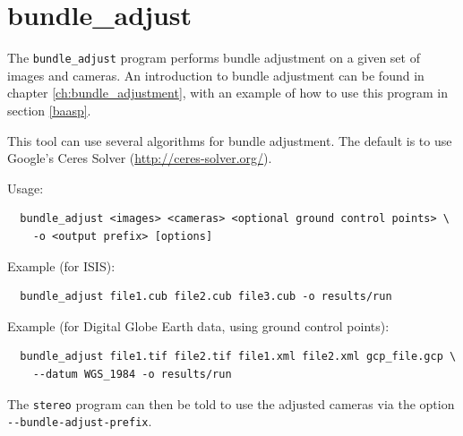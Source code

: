 \newpage
\section{bundle\_adjust}
\label{bundleadjust}

The \texttt{bundle\_adjust} program performs bundle adjustment on a
given set of images and cameras. An introduction to bundle adjustment
can be found in chapter \ref{ch:bundle_adjustment}, with an example of
how to use this program in section \ref{baasp}.

This tool can use several algorithms for bundle adjustment. The default is
to use Google's Ceres Solver (\url{http://ceres-solver.org/}).

Usage:
\begin{verbatim}
  bundle_adjust <images> <cameras> <optional ground control points> \
    -o <output prefix> [options]
\end{verbatim}

Example (for ISIS):
\begin{verbatim}
  bundle_adjust file1.cub file2.cub file3.cub -o results/run
\end{verbatim}

Example (for Digital Globe Earth data, using ground control points):
\begin{verbatim}
  bundle_adjust file1.tif file2.tif file1.xml file2.xml gcp_file.gcp \
    --datum WGS_1984 -o results/run
\end{verbatim}

The \texttt{stereo} program can then be told to use the adjusted cameras
via the option \texttt{-\/-bundle-adjust-prefix}.

